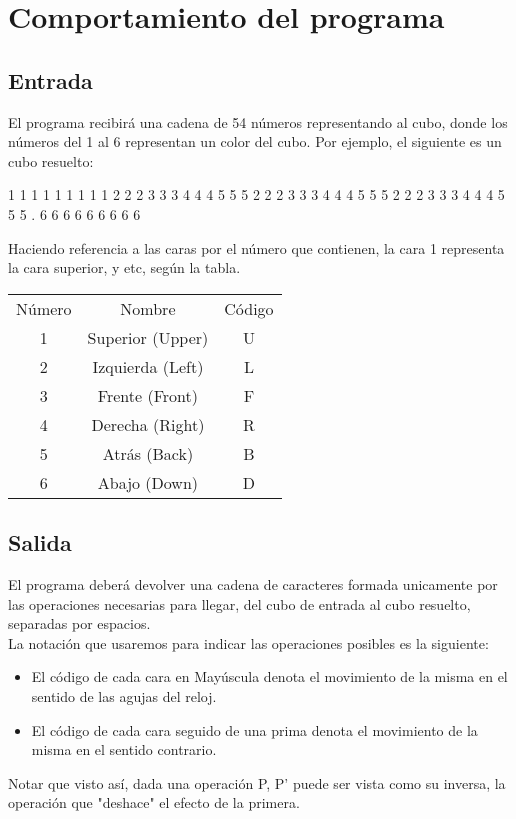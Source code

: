 \documentclass[11pt,twoside,a4paper]{article}
\begin{document}
\section{Comportamiento del programa}

\subsection{Entrada}
El programa recibirá una cadena de 54 números representando al cubo, donde los números del 1 al 6 representan un color del cubo. Por ejemplo, el siguiente es un cubo resuelto: \\
\begin{center}
\begin{verbbox}
      1 1 1 
      1 1 1 
      1 1 1 
2 2 2 3 3 3 4 4 4 5 5 5 
2 2 2 3 3 3 4 4 4 5 5 5 
2 2 2 3 3 3 4 4 4 5 5 5           .
      6 6 6 
      6 6 6 
      6 6 6 
\end{verbbox}

\theverbbox
\end{center}

Haciendo referencia a las caras por el número que contienen, la cara 1 representa la cara superior, y etc, según la tabla. \\

\begin{tabular}{c c c}
Número & Nombre & Código \\
1 & Superior (Upper) & U \\
2 & Izquierda (Left) & L \\
3 & Frente (Front) & F \\
4 & Derecha (Right) & R \\
5 & Atrás (Back) & B \\
6 & Abajo (Down) & D \\
\end{tabular}

\subsection{Salida}
El programa deberá devolver una cadena de caracteres formada unicamente por las operaciones necesarias para llegar, del cubo de entrada al cubo resuelto, separadas por espacios.\\
La notación que usaremos para indicar las operaciones posibles es la siguiente:
\begin{itemize}
\item El código de cada cara en Mayúscula denota el movimiento de la misma en el sentido de las agujas del reloj.
\item El código de cada cara seguido de una prima denota el movimiento de la misma en el sentido contrario. 
\end{itemize}

Notar que visto así, dada una operación P, P' puede ser vista como su inversa, la operación que "deshace" el efecto de la primera.
\end{document}
